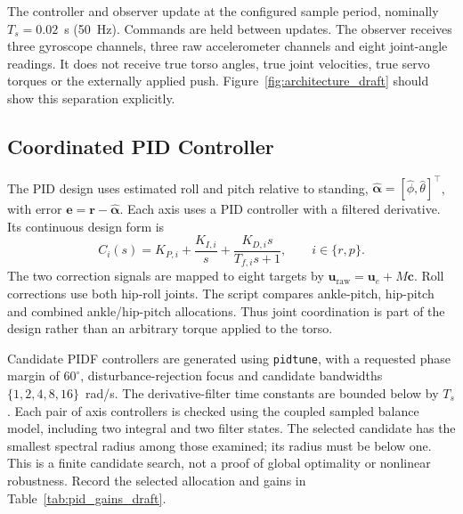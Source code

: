 \documentclass[conference,a4paper]{IEEEtran}
\begin{document}
The controller and observer update at the configured sample period,
nominally $T_s=0.02$~s (50~Hz). Commands are held between updates. The observer
receives three gyroscope channels, three raw accelerometer channels and eight
joint-angle readings. It does not receive true torso angles, true joint
velocities, true servo torques or the externally applied push.
Figure~\ref{fig:architecture_draft} should show this separation explicitly.


\subsection{Coordinated PID Controller}
The PID design uses estimated roll and pitch relative to standing,
$\hat{\boldsymbol\alpha}=[\hat\phi,\hat\theta]^\top$, with error
$\mathbf e=\mathbf r-\hat{\boldsymbol\alpha}$. Each axis uses a PID controller
with a filtered derivative. Its continuous design form is
\begin{equation}
 C_i(s)=K_{P,i}+\frac{K_{I,i}}{s}
             +\frac{K_{D,i}s}{T_{f,i}s+1},\qquad i\in\{r,p\}.
\end{equation}
The two correction signals are mapped to eight targets by
$\mathbf u_{\mathrm{raw}}=\mathbf u_e+M\mathbf c$.
Roll corrections use both hip-roll joints. The script compares ankle-pitch,
hip-pitch and combined ankle/hip-pitch allocations. Thus joint coordination
is part of the design rather than an arbitrary torque applied to the torso.

Candidate PIDF controllers are generated using \texttt{pidtune}, with a
requested phase margin of $60^\circ$, disturbance-rejection focus and candidate
bandwidths $\{1,2,4,8,16\}$~rad/s. The derivative-filter time constants are
bounded below by $T_s$. Each pair of axis controllers is checked using the
coupled sampled balance model, including two integral and two filter states.
The selected candidate has the smallest spectral radius among those examined;
its radius must be below one. This is a finite candidate search, not a proof
of global optimality or nonlinear robustness. Record the selected allocation
and gains in Table~\ref{tab:pid_gains_draft}.
\end{document}
